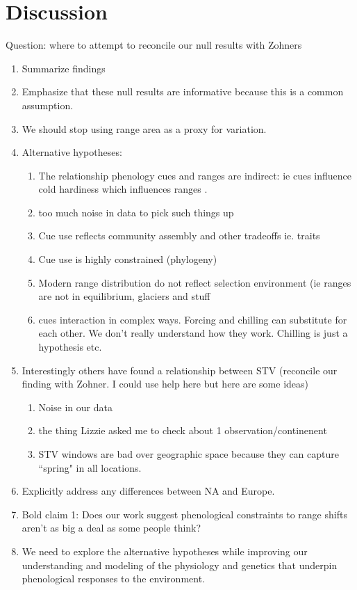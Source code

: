 \documentclass[11pt]{article}\usepackage[]{graphicx}\usepackage[]{color}
\begin{document}
\section*{Discussion}
Question: where to attempt to reconcile our null results with Zohners
\begin{enumerate}
\item Summarize findings
\item Emphasize that these null results are informative because this is a common assumption.
\item We should stop using range area as a proxy for variation.
\item Alternative hypotheses:
\begin{enumerate}
\item The relationship phenology cues and ranges are indirect: ie cues influence cold hardiness which influences ranges \citep{}.
\item too much noise in data to pick such things up
\item Cue use reflects community assembly and other tradeoffs ie. traits
\item Cue use is highly constrained (phylogeny)
\item Modern range distribution do not reflect selection environment (ie ranges are not in equilibrium, glaciers and stuff
\item cues interaction in complex ways. Forcing and chilling can substitute for each other. We don't really understand how they work. Chilling is just a hypothesis etc.
\end{enumerate}
\item Interestingly others have found a relationship between STV (reconcile our finding with Zohner. I could use help here but here are some ideas)
\begin{enumerate}
\item  Noise in our data
\item the thing Lizzie asked me to check about 1 observation/continenent
\item STV windows are bad over geographic space because they can capture ``spring" in all locations.
\end{enumerate}
\item Explicitly address any differences between NA and Europe.
\item Bold claim 1: Does our work suggest phenological constraints to range shifts aren't as big a deal as some people think?
\item We need to explore the alternative hypotheses while improving our understanding and modeling of the physiology and genetics that underpin phenological responses to the environment.
\end{enumerate}
\end{document}
